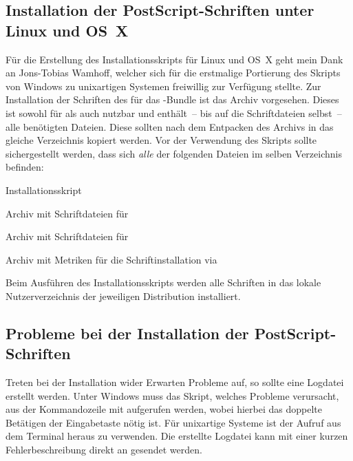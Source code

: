 \subsection{Installation der PostScript-Schriften unter Linux und OS~X}
\label{sec:install:fonts:unix}
Für die Erstellung des Installationsskripts für Linux und OS~X geht mein Dank 
an Jons-Tobias Wamhoff, welcher sich für die erstmalige Portierung des Skripts 
von Windows zu unixartigen Systemen freiwillig zur Verfügung stellte.
Zur Installation der Schriften des \CDs für das \TUDScript-Bundle ist das Archiv
%
{} vorgesehen. Dieses ist sowohl für 
 als auch  
nutzbar und enthält~-- bis auf die Schriftdateien selbst~-- alle benötigten 
Dateien. Diese sollten nach dem Entpacken des Archivs in das gleiche 
Verzeichnis kopiert werden. Vor der Verwendung des Skripts 
 sollte sichergestellt werden, dass sich 
\emph{alle} der folgenden Dateien im selben Verzeichnis befinden:
%
%
\begin{description}[labelwidth=\tempdim,labelsep=1em]
  \item[\File{tudscrfonts\_install.sh}]Installationsskript
  \item[\File{Univers\_PS.zip}]Archiv mit Schriftdateien für \Univers
  \item[\File{DIN\_Bd\_PS.zip}]Archiv mit Schriftdateien für \DIN
  \item[\File{tudscrfonts.zip}]Archiv mit Metriken für die
    Schriftinstallation via 
\end{description}
%
Beim Ausführen des Installationsskripts werden alle Schriften in das lokale 
Nutzerverzeichnis der jeweiligen Distribution installiert.


\subsection{Probleme bei der Installation der PostScript-Schriften}
Treten bei der Installation wider Erwarten Probleme auf, so sollte eine 
Logdatei erstellt werden. Unter Windows muss das Skript, welches Probleme 
verursacht, aus der Kommandozeile mit
 aufgerufen werden, wobei hierbei 
das doppelte Betätigen der Eingabetaste nötig ist. Für unixartige Systeme 
ist der Aufruf  aus dem Terminal 
heraus zu verwenden. Die erstellte Logdatei kann mit einer kurzen 
Fehlerbeschreibung direkt an \Email{\tudscrmail} gesendet werden.




